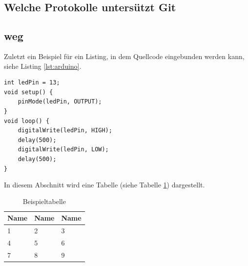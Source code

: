 \documentclass[12pt,a4paper,bibliography=totocnumbered,listof=totocnumbered]{scrartcl}
\begin{document}
\subsection{Welche Protokolle untersützt Git}
\pagebreak

\subsection{weg}
Zuletzt ein Beispiel für ein Listing, in dem Quellcode eingebunden werden kann, siehe Listing \ref{lst:arduino}.

\vspace{1em}
\begin{lstlisting}[caption=Arduino Beispielprogramm, label=lst:arduino]
int ledPin = 13;
void setup() {
    pinMode(ledPin, OUTPUT);
}
void loop() {
    digitalWrite(ledPin, HIGH);
    delay(500);
    digitalWrite(ledPin, LOW);
    delay(500);
}
\end{lstlisting}

In diesem Abschnitt wird eine Tabelle (siehe Tabelle \ref{tab:beispiel}) dargestellt.

\vspace{1em}
\begin{table}[!h]
	\centering
	\begin{tabular}{|l|l|l|}
		\hline
		\textbf{Name} & \textbf{Name} & \textbf{Name}\\
		\hline
		1 & 2 & 3\\
		\hline
		4 & 5 & 6\\
		\hline
		7 & 8 & 9\\
		\hline
	\end{tabular}
	\caption{Beispieltabelle}
	\label{tab:beispiel}
\end{table}



\renewcommand\refname{Quellenverzeichnis}


\pagebreak

\setcounter{page}{1}
\end{document}
